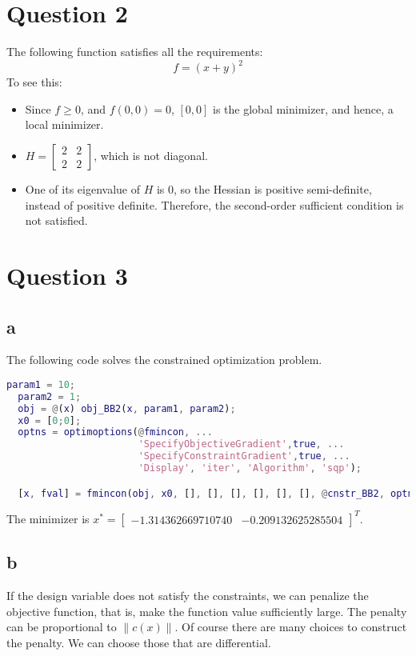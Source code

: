\documentclass[a4paper]{article}
\newcommand\norm[1]{\left\lVert#1\right\rVert}
\begin{document}
\section*{Question 2}
The following function satisfies all the requirements:
\begin{equation*}
  f = (x+y)^2
\end{equation*}
To see this:
\begin{itemize}
  \item Since $f\ge 0$, and $f(0,0) = 0$, $[0,0]$ is the global minimizer, and hence, a local minimizer.
  \item $H = \begin{bmatrix}
    2 & 2 \\ 2 & 2
  \end{bmatrix}$, which is not diagonal. 
  \item One of its eigenvalue of $H$ is $0$, so the Hessian is positive semi-definite, instead of positive definite. Therefore, the second-order sufficient condition is not satisfied.
\end{itemize}

\section*{Question 3}
\subsection*{a}
The following code solves the constrained optimization problem.
\begin{lstlisting}[language=Matlab, 
                    keywordstyle=\color{blue},
                    stringstyle=\color{red},
                    commentstyle=\color{green}]
  param1 = 10; 
  param2 = 1;
  obj = @(x) obj_BB2(x, param1, param2);
  x0 = [0;0];
  optns = optimoptions(@fmincon, ...
                       'SpecifyObjectiveGradient',true, ...
                       'SpecifyConstraintGradient',true, ...
                       'Display', 'iter', 'Algorithm', 'sqp');

  [x, fval] = fmincon(obj, x0, [], [], [], [], [], [], @cnstr_BB2, optns);
\end{lstlisting}
The minimizer is $x^* = \begin{bmatrix}
-1.314362669710740 & -0.209132625285504\end{bmatrix}^T$.

\subsection*{b}
If the design variable does not satisfy the constraints, we can penalize the objective function, that is, make the function value sufficiently large. The penalty can be proportional to $\norm{c(x)}$. Of course there are many choices to construct the penalty. We can choose those that are differential.
\end{document}
